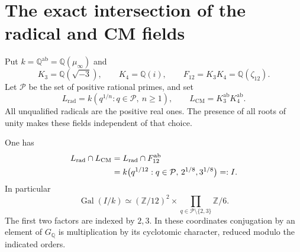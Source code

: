 \section{The exact intersection of the radical and CM fields}
\label{sec:radical-cm-entanglement}

Put $k=\mathbb Q^{\mathrm{ab}}=\mathbb Q(\mu_\infty)$ and
\[
 K_3=\mathbb Q(\sqrt{-3}),\qquad K_4=\mathbb Q(i),\qquad
 F_{12}=K_3K_4=\mathbb Q(\zeta_{12}).
\]
Let $\mathcal P$ be the set of positive rational primes, and set
\[
 L_{\mathrm{rad}}=k(q^{1/n}:q\in\mathcal P,\ n\geq1),\qquad
 L_{\mathrm{CM}}=K_3^{\mathrm{ab}}K_4^{\mathrm{ab}}.
\]
All unqualified radicals are the positive real ones.  The presence
of all roots of unity makes these fields independent of that choice.

\begin{theorem}\label{thm:radical-cm-intersection}
One has
\begin{align}
 L_{\mathrm{rad}}\cap L_{\mathrm{CM}}
 &=L_{\mathrm{rad}}\cap F_{12}^{\mathrm{ab}}\notag\\
 &=k\bigl(q^{1/12}:q\in\mathcal P,\,
                         2^{1/8},3^{1/8}\bigr)=:I.
 \label{eq:radical-cm-intersection}
\end{align}
In particular
\begin{equation}
 \operatorname{Gal}(I/k)\simeq
 (\mathbb Z/12)^2\times
       \prod_{q\in\mathcal P\setminus\{2,3\}}\mathbb Z/6.
 \label{eq:radical-cm-common-group}
\end{equation}
The first two factors are indexed by $2,3$.  In these coordinates
conjugation by an element of $G_{\mathbb Q}$ is multiplication by
its cyclotomic character, reduced modulo the indicated orders.
\end{theorem}

